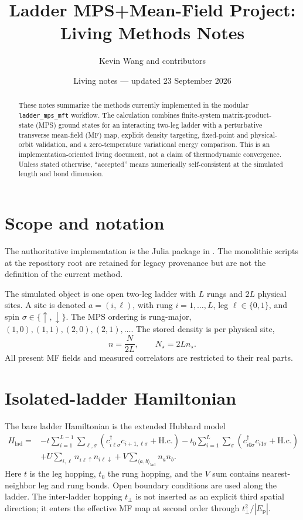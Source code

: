 \documentclass[11pt]{article}
\title{Ladder MPS+Mean-Field Project: Living Methods Notes}
\author{Kevin Wang and contributors}
\date{Living notes --- updated 23 September 2026}
\newcommand{\Hlad}{H_{\mathrm{lad}}}
\newcommand{\Ep}{E_{\mathrm p}}
\newcommand{\tp}{t_{\perp}}
\newcommand{\hc}{\mathrm{H.c.}}
\begin{document}
\maketitle

\begin{abstract}
These notes summarize the methods currently implemented in the modular
\texttt{ladder\_mps\_mft} workflow.  The calculation combines finite-system
matrix-product-state (MPS) ground states for an interacting two-leg ladder with
a perturbative transverse mean-field (MF) map, explicit density targeting,
fixed-point and physical-orbit validation, and a zero-temperature variational
energy comparison.  This is an implementation-oriented living document, not a
claim of thermodynamic convergence.  Unless stated otherwise, ``accepted''
means numerically self-consistent at the simulated length and bond dimension.
\end{abstract}

\tableofcontents

\section{Scope and notation}

The authoritative implementation is the Julia package in
.  The monolithic scripts at the repository root are
retained for legacy provenance but are not the definition of the current
method.

The simulated object is one open two-leg ladder with \(L\) rungs and \(2L\)
physical sites.  A site is denoted \(a=(i,\ell)\), with rung
\(i=1,\ldots,L\), leg \(\ell\in\{0,1\}\), and spin
\(\sigma\in\{\uparrow,\downarrow\}\).  The MPS ordering is rung-major,
\((1,0),(1,1),(2,0),(2,1),\ldots\).  The stored density is per physical site,
\begin{equation}
  n = \frac{N}{2L}, \qquad N_{\star}=2L n_{\star}.
\end{equation}
All present MF fields and measured correlators are restricted to their real
parts.

\section{Isolated-ladder Hamiltonian}

The bare ladder Hamiltonian is the extended Hubbard model
\begin{align}
\Hlad={}&-t\sum_{i=1}^{L-1}\sum_{\ell,\sigma}
 \left(c^{\dagger}_{i\ell\sigma}c_{i+1,\ell\sigma}+\hc\right)
 -t_0\sum_{i=1}^{L}\sum_{\sigma}
 \left(c^{\dagger}_{i0\sigma}c_{i1\sigma}+\hc\right) \nonumber\\
&+U\sum_{i,\ell}n_{i\ell\uparrow}n_{i\ell\downarrow}
 +V\sum_{\langle a,b\rangle_{\mathrm{lad}}}n_a n_b .
\label{eq:bare-hamiltonian}
\end{align}
Here \(t\) is the leg hopping, \(t_0\) the rung hopping, and the \(V\) sum
contains nearest-neighbor leg and rung bonds.  Open boundary conditions are
used along the ladder.  The inter-ladder hopping \(\tp\) is not inserted as an
explicit third spatial direction; it enters the effective MF map at second
order through \(\tp^2/|\Ep|\).
\end{document}

